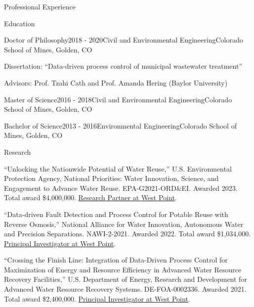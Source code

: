 \documentclass{resume} %
\begin{document}
\begin{rSection}{Professional Experience}
\begin{rSection}{Education}

\begin{rSubsection}{Doctor of Philosophy}{2018 - 2020}{Civil and Environmental Engineering}{Colorado School of Mines, Golden, CO}
\item Dissertation: “Data-driven process control of municipal wastewater treatment”
\item Advisors: Prof. Tzahi Cath and Prof. Amanda Hering (Baylor University)
\end{rSubsection}

\begin{rSubsection}{Master of Science}{2016 - 2018}{Civil and Environmental Engineering}{Colorado School of Mines, Golden, CO}
\end{rSubsection}

\begin{rSubsection}{Bachelor of Science}{2013 - 2016}{Environmental Engineering}{Colorado School of Mines, Golden, CO}
\end{rSubsection}

\end{rSection}



\begin{rSection}{Research}

``Unlocking the Nationwide Potential of Water Reuse,'' U.S. Environmental Protection Agency, National Priorities: Water Innovation, Science, and Engagement to Advance Water Reuse. EPA-G2021-ORD\&EI. Awarded 2023. Total award \$4,000,000. \ul{Research Partner at West Point}.

``Data-driven Fault Detection and Process Control for Potable Reuse with Reverse Osmosis,'' National Alliance for Water Innovation, Autonomous Water and Precision Separations. NAWI-2-2021. Awarded 2022. Total award \$1,034,000. \ul{Principal Investigator at West Point}.

``Crossing the Finish Line: Integration of Data-Driven Process Control for Maximization of Energy and Resource Efficiency in Advanced Water Resource Recovery Facilities,'' U.S. Department of Energy, Research and Development for Advanced Water Resource Recovery Systems. DE-FOA-0002336. Awarded 2021. Total award \$2,400,000. \ul{Principal Investigator at West Point}.


\end{rSection}
\end{rSection}
\end{document}
